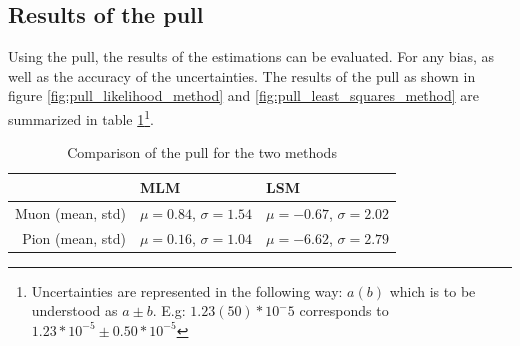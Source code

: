 \documentclass[11pt, a4paper, oneside]{book}
\begin{document}

\subsection{Results of the pull} 

Using the pull, the results of the estimations can be evaluated. For any bias, as well as the accuracy of the uncertainties. The results of the pull as shown in figure \ref{fig:pull_likelihood_method} and \ref{fig:pull_least_squares_method} are summarized in table \ref{tab:pull_results}\footnote{Uncertainties are represented in the following way: $a(b)$ which is to be understood as $a \pm b$. E.g: $1.23(50)*10^-5$ corresponds to $1.23*10^{-5} \pm 0.50 * 10^{-5}$}.


\begin{table}[H]
\centering
  \caption{Comparison of the pull for the two methods}
  \label{tab:pull_results}
  \begin{tabular}{r|ll}
                   & MLM                                & LSM \\ \hline
  Muon (mean, std) & $\mu = 0.84$, $\sigma = 1.54 $     & $\mu = -0.67$, $\sigma = 2.02$  \\
  Pion (mean, std) & $\mu = 0.16$, $\sigma = 1.04$     & $\mu = -6.62$, $\sigma = 2.79$ 
  \end{tabular}
\end{table}
\end{document}
